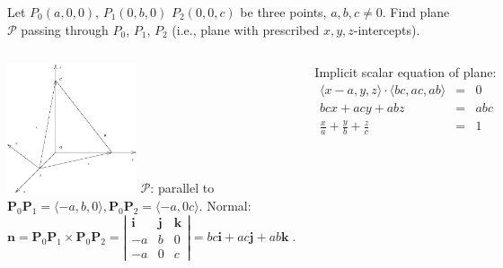 \begin{frame}
\begin{example}
Let $P_0(a,0,0)$, $P_1(0,b,0)$  $P_2(0,0,c)$ be three points, $a,b,c\neq 0$. Find plane $\mathcal{P}$ passing through $P_0$, $P_1$, $P_2$ (i.e., plane with prescribed $x,y,z$-intercepts).

\bigskip

\begin{columns}
        \includegraphics[width=1.5in]{../../modules/vectors/pictures/ok-plane_intercepts.eps}
$\mathcal{P}$: parallel to $\textbf{P}_0\textbf{P}_1 = \langle -a, b, 0\rangle, \textbf{P}_0\textbf{P}_2 = \langle -a, 0 c\rangle.$ Normal: 
$$\textbf{n} =\textbf{P}_0\textbf{P}_1 \times \textbf{P}_0\textbf{P}_2=
\left| \begin{array}{ccc}
        \textbf{i} & \textbf{j} & \textbf{k} \\
	-a & b & 0 \\
        -a & 0 & c
       \end{array}
 \right| = bc \textbf{i} + ac \textbf{j} + ab \textbf{k}\; .$$

Implicit scalar equation of plane:
\[
\begin{array}{rcl}
\langle x-a, y, z \rangle \cdot \langle bc, ac, ab \rangle &=& 0\\
bcx+acy + abz &=& abc \\
\frac{x}{a} + \frac{y}{b} + \frac{z}{c} &=& 1
\end{array}
\]
\end{columns}
\end{example}
\end{frame}